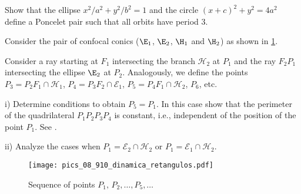 
\begin{exercise}\label{exer:81}
Show that the ellipse $x^2/a^2+y^2/b^2=1$ and the circle $(x+c)^2+y^2=4a^2$ define  a Poncelet pair such that  all  orbits have   period 3.
\end{exercise}


\begin{exercise}\label{exerc:82} Consider the pair of confocal conics ($\E_1$, $\E_2$, $\H_1$ and $\H_2$) as shown in  \cref{fig:retangulo_exerc82}.

  Consider a ray starting at $F_1$ intersecting the branch $\mathcal{H}_2$ at $P_1$ and  the ray
  $F_2P_1$  intersecting the ellipse $\E_2$  at $P_2$. Analogously, we define the points $P_3=P_2F_1\cap\mathcal{H}_1$, $P_4=P_3F_2\cap\mathcal{E}_1$, $P_5=P_4F_1\cap\mathcal{H}_2$,
  $P_6$, etc.  
  
\noindent i) Determine conditions to obtain $P_5=P_1.$ 
In this case show that the perimeter of the quadrilateral
$P_1P_2P_3P_4$ is constant, i.e., independent of the position of the point $P_1$.  See \cite{dolgirev2014}.


\noindent ii) Analyze the cases when $P_1=\mathcal{E}_2\cap \mathcal{H}_2$ or $P_1=\mathcal{E}_1\cap \mathcal{H}_2$.

 \begin{figure}[H]
 	\begin{center}
 	 \texttt{[image:  pics\_08\_910\_dinamica\_retangulos.pdf]}
 		\caption {Sequence of points $P_1,  \,P_2, \ldots,  P_5 ,  \ldots$  
 		 \label{fig:retangulo_exerc82} }
 	\end{center}
 	\end{figure}
 	
 	\end{exercise}